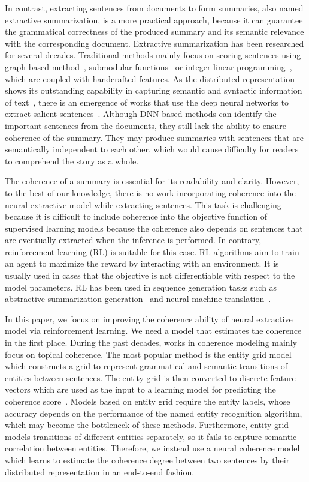 \documentclass[letterpaper]{article} %
\begin{document}
	In contrast, extracting sentences from documents to form summaries, also named extractive summarization, is a more practical approach, because it can guarantee the grammatical correctness of the produced summary and its semantic relevance with the corresponding document. Extractive summarization has been researched for several decades. Traditional methods mainly focus on scoring sentences using graph-based method~\cite{graph_based}, submodular functions~\cite{lin_class_2011} or integer linear programming~\cite{ilp}, which are coupled with handcrafted features. As the distributed representation shows its outstanding capability in capturing semantic and syntactic information of text~\cite{word2vec}, there is an emergence of works that use the deep neural networks to extract salient sentences~\cite{jianpeng2016,SummaRuNNer}. Although DNN-based methods can identify the important sentences from the documents, they still lack the ability to ensure coherence of the summary. They may produce summaries with sentences that are semantically independent to each other, which would cause difficulty for readers to comprehend the story as a whole. 
	
	The coherence of a summary is essential for its readability and clarity. However, to the best of our knowledge, there is no work incorporating coherence into the neural extractive model while extracting sentences. This task is challenging because it is difficult to include coherence into the objective function of supervised learning models because the coherence also depends on sentences that are eventually extracted when the inference is performed. In contrary, reinforcement learning (RL) is suitable for this case. RL algorithms aim to train an agent to maximize the reward by interacting with an environment. It is usually used in cases that the objective is not differentiable with respect to the model parameters. RL has been used in sequence generation tasks such as abstractive summarization generation~\cite{socher2017_summarization} and neural machine translation~\cite{rl2nmt}.
	
	In this paper, we focus on improving the coherence ability of neural extractive model via reinforcement learning. We need a model that estimates the coherence in the first place. During the past decades, works in coherence modeling mainly focus on topical coherence. The most popular method is the entity grid model~\cite{entitygrid} which constructs a grid to represent grammatical and semantic transitions of entities between sentences. The entity grid is then converted to discrete feature vectors which are used as the input to a learning model for predicting the coherence score~\cite{nlcm}. Models based on entity grid require the entity labels, whose accuracy depends on the performance of the named entity recognition algorithm, which may become the bottleneck of these methods. Furthermore, entity grid models transitions of different entities separately, so it fails to capture semantic correlation between entities. Therefore, we instead use a neural coherence model which learns to estimate the coherence degree between two sentences by their distributed representation in an end-to-end fashion. 
	
\end{document}
